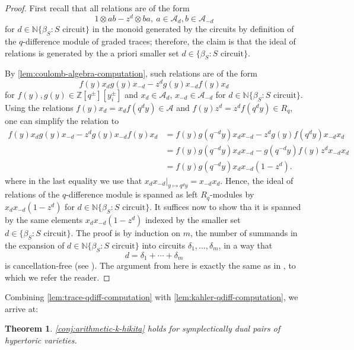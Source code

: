\documentclass[reqno]{amsart}
\numberwithin{equation}{section}
\numberwithin{equation}{section}
\numberwithin{equation}{section}
\newtheorem{thm}{Theorem}[section]
\theoremstyle{definition}
\theoremstyle{remark}
\theoremstyle{remark}
\begin{document}
\begin{proof}
    First recall that all relations are of the form
    \begin{equation}
        1 \otimes ab - z^d \otimes ba, \ a \in \mathcal{A}_d, b \in \mathcal{A}_{-d}
    \end{equation}
    for $d \in \mathbb{N}\{ \beta_S: S \mbox{ circuit} \}$ in the monoid generated by the circuits by definition of the $q$-difference module of graded traces; therefore, the claim is that the ideal of relations is generated by the a priori smaller set $d \in \{ \beta_S : S \mbox{ circuit} \}$. 

    By \cref{lem:coulomb-algebra-computation}, such relations are of the form
    \begin{equation}
        f(y)x_d g(y)x_{-d} - z^d g(y)x_{-d} f(y) x_d
    \end{equation}
    for $f(y), g(y) \in \mathbb{Z}[q^\pm][y_i^\pm]$ and $x_d \in \mathcal{A}_d$, $x_{-d} \in \mathcal{A}_{-d}$ for $d \in \mathbb{N}\{ \beta_S: S \mbox{ circuit} \}$. Using the relations $f(y) x_d = x_d f(q^dy) \in \mathcal{A}$ and $f(y)z^d = z^df(q^dy) \in R_q$, one can simplify the relation to
    \begin{align*}
        f(y)x_d g(y)x_{-d} - z^d g(y)x_{-d} f(y) x_d &= f(y) g(q^{{-d}}y) x_d x_{-d} - z^d g(y) f(q^d y) x_{-d} x_d\\ &=     f(y) g(q^{{-d}}y) x_d x_{-d} - g(q^{-d }y) f( y) z^d  x_{-d} x_d     \\
        &=f(y) g(q^{-d}y) x_d x_{-d} (1-z^d).
    \end{align*}
    where in the last equality we use that $x_d x_{-d}|_{y \mapsto q^d y} = x_{-d} x_d$. Hence, the ideal of relations of the $q$-difference module is spanned as left $R_q$-modules by $x_dx_{-d} (1-z^d)$ for $d \in \mathbb{N}\{ \beta_S : S \mbox{ circuit} \}$. It suffices now to show tha it is spanned by the same elements $x_d x_{-d} (1-z^d)$ indexed by the smaller set $d \in \{ \beta_S : S \mbox{ circuit} \}$. The proof is by induction on $m$,  the number of summands in the expansion of $d \in\mathbb{N}\{ \beta_S : S \mbox{ circuit} \} $ into circuits $\delta_1, \dots, \delta_m$, in a way that
    \begin{equation}
        d = \delta_1 + \cdots + \delta_m
    \end{equation}
    is cancellation-free (see \cite[Lemma 6.2]{KMP21}). The argument from here is exactly the same as in \cite[Proposition 6.8]{KMP21}, to which we refer the reader.
\end{proof}


Combining \cref{lem:trace-qdiff-computation} with \cref{lem:kahler-qdiff-computation}, we arrive at:
\begin{thm}\label{thm:arithmetic-k-hikta-hypertoric}
    \cref{conj:arithmetic-k-hikita} holds for symplectically dual pairs of hypertoric varieties.
\end{thm}




\end{document}
